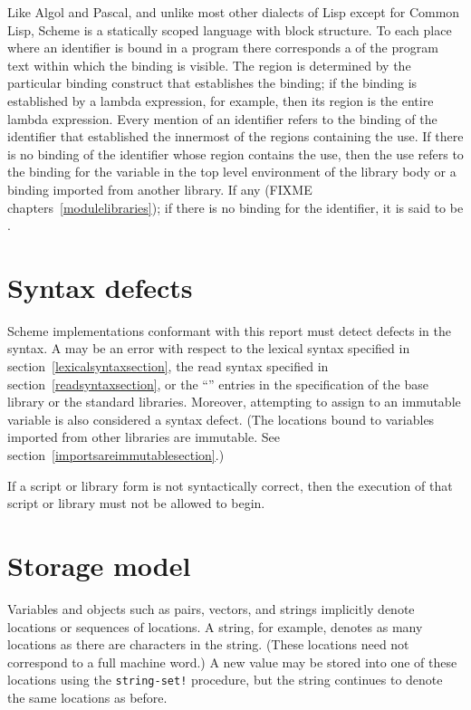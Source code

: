 
\vest Like Algol and Pascal, and unlike most other dialects of Lisp
except for Common Lisp, Scheme is a statically scoped language with
block structure.  To each place where an identifier is bound in a program
there corresponds a  of the program text within which
the binding is visible.  The region is determined by the particular
binding construct that establishes the binding; if the binding is
established by a {\cf lambda} expression, for example, then its region
is the entire {\cf lambda} expression.  Every mention of an identifier
refers to the binding of the identifier that established the
innermost of the regions containing the use.  If there is no binding of
the identifier whose region contains the use, then the use refers to the
binding for the variable in the top level environment of the library
body or a binding imported from another library.  If any
(FIXME chapters~\ref{modulelibraries}); if there is no
binding for the identifier,
it is said to be .

\section{Syntax defects}

Scheme implementations conformant with this report must detect
defects in the syntax.  A  may be an error with
respect to the lexical syntax specified in
section~\ref{lexicalsyntaxsection}, the read syntax specified in
section~\ref{readsyntaxsection}, or the ``\exprtype'' entries in the
specification of the base library or the standard libraries.
Moreover, attempting to assign to an immutable variable is also
considered a syntax defect.  (The locations bound to variables
imported from other libraries are immutable.  See
section~\ref{importsareimmutablesection}.)

If a script or library form is not syntactically correct, then the
execution of that script or library must not be allowed to begin.

\section{Storage model}
\label{storagemodel}

Variables and objects such as pairs, vectors, and strings implicitly
denote locations or sequences of locations.  A string, for
example, denotes as many locations as there are characters in the string. 
(These locations need not correspond to a full machine word.) A new value may be
stored into one of these locations using the {\tt string-set!} procedure, but
the string continues to denote the same locations as before.


